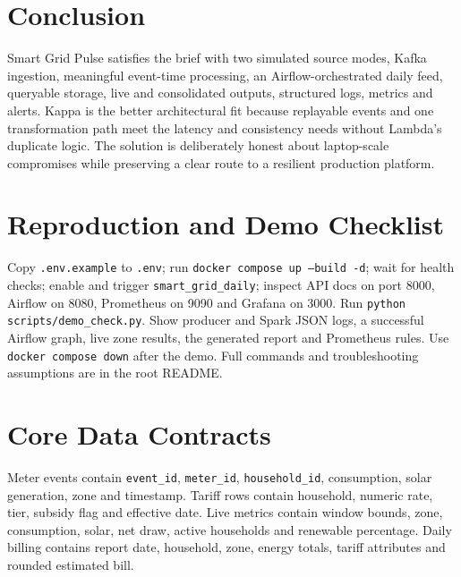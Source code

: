 \documentclass[11pt,a4paper]{article}
\newcommand{\code}[1]{\texttt{#1}}
\begin{document}
\section{Conclusion}
Smart Grid Pulse satisfies the brief with two simulated source modes, Kafka ingestion, meaningful event-time processing, an Airflow-orchestrated daily feed, queryable storage, live and consolidated outputs, structured logs, metrics and alerts. Kappa is the better architectural fit because replayable events and one transformation path meet the latency and consistency needs without Lambda's duplicate logic. The solution is deliberately honest about laptop-scale compromises while preserving a clear route to a resilient production platform.

\appendix
\section{Reproduction and Demo Checklist}
Copy \code{.env.example} to \code{.env}; run \code{docker compose up --build -d}; wait for health checks; enable and trigger \code{smart\_grid\_daily}; inspect API docs on port 8000, Airflow on 8080, Prometheus on 9090 and Grafana on 3000. Run \code{python scripts/demo\_check.py}. Show producer and Spark JSON logs, a successful Airflow graph, live zone results, the generated report and Prometheus rules. Use \code{docker compose down} after the demo. Full commands and troubleshooting assumptions are in the root README.

\section{Core Data Contracts}
Meter events contain \code{event\_id}, \code{meter\_id}, \code{household\_id}, consumption, solar generation, zone and timestamp. Tariff rows contain household, numeric rate, tier, subsidy flag and effective date. Live metrics contain window bounds, zone, consumption, solar, net draw, active households and renewable percentage. Daily billing contains report date, household, zone, energy totals, tariff attributes and rounded estimated bill.
\end{document}

